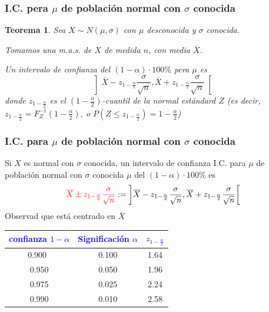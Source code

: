 \documentclass[12pt,t]{beamer}\usepackage[]{graphicx}\usepackage[]{color}
\newcommand{\red}[1]{\textcolor{red}{#1}}
\newcommand{\blue}[1]{\textcolor{blue}{#1}}
\renewcommand{\leq}{\leqslant}
\theoremstyle{plain}
\newtheorem{teorema}{Teorema}
\theoremstyle{definition}
\begin{document}
\begin{frame}
\frametitle{I.C. pera $\mu$ de población normal con $\sigma$ conocida}
\vspace*{-3ex}

\begin{teorema}
Sea $X\sim N(\mu,\sigma)$ con $\mu$ desconocida y $\sigma$ conocida.
\medskip

Tomamos una m.a.s. de $X$ de medida $n$, con media $\overline{X}$.
\medskip

Un intervalo de confianza  del $(1-\alpha)\cdot 100\%$ pera $\mu$  es
$$
\left]\overline{X} -z_{1-\frac{\alpha}{2}} \frac{\sigma}{\sqrt{n}}, \overline{X}+z_{1-\frac{\alpha}{2}}\frac{\sigma}{\sqrt{n}}
\right[
$$
donde $z_{1-\frac{\alpha}{2}}$ es el $(1-\frac{\alpha}{2})$-cuantil de la normal  estándard $Z$ (es decir, $z_{1-\frac{\alpha}{2}}=F_Z^{-1}(1-\frac{\alpha}{2})$, o $P(Z\leq z_{1-\frac{\alpha}{2}})=1-\frac{\alpha}{2}$)
\end{teorema}


\end{frame}


\begin{frame}
\frametitle{I.C. para $\mu$ de población normal con $\sigma$ conocida}

Si $X$ es normal con $\sigma$ conocida, un intervalo de confianza  I.C. para $\mu$ de población normal con $\sigma$ conocida $\mu$ del $(1-\alpha)\cdot 100\%$ es
$$
\red{\overline{X} \pm z_{1-\frac{\alpha}{2}} \frac{\sigma}{\sqrt{n}}}:=\left]\overline{X} -z_{1-\frac{\alpha}{2}} \frac{\sigma}{\sqrt{n}}, \overline{X}+z_{1-\frac{\alpha}{2}}\frac{\sigma}{\sqrt{n}}
\right[
$$
Observad que está centrado   en $\overline{X}$
\begin{center}
\begin{tabular}{c|c|c}
\blue{confianza  $1-\alpha$} & \blue{Significación $\alpha$} & \blue{$z_{1-\frac{\alpha}{2}}$}\\
 \hline
0.900\ & 0.100 &1.64 \\   
0.950 & 0.050 & 1.96\\
0.975 & 0.025 & 2.24 \\
0.990 & 0.010 & 2.58
\end{tabular}
\end{center}

\end{frame}
\end{document}
